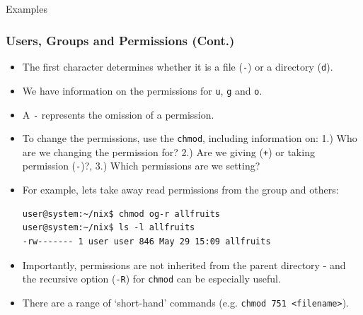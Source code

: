 \documentclass[10pt]{beamer}
\begin{document}
\subsection{}
\begin{frame}[fragile]{Examples}
\frametitle{Users, Groups and Permissions (Cont.)}
\begin{itemize}
\item The first character determines whether it is a file (\texttt{-}) or a directory (\texttt{d}).\vspace{0.05in}
\item We have information on the permissions for \texttt{u}, \texttt{g} and \texttt{o}.\vspace{0.05in}
\item A \texttt{-} represents the omission of a permission.\vspace{0.05in}
\item To change the permissions, use the \texttt{chmod}, including information on: 1.) Who are we changing the permission for? 2.) Are we giving (\texttt{+}) or taking permission (\texttt{-})?, 3.) Which permissions are we setting? \vspace{0.05in}
\item For example, lets take away read permissions from the group and others:
\begin{lstlisting}[style=BashInputStyle]
user@system:~/nix$ chmod og-r allfruits
user@system:~/nix$ ls -l allfruits
-rw------- 1 user user 846 May 29 15:09 allfruits
\end{lstlisting}\vspace{0.05in}
\item Importantly,  permissions are not inherited from the parent directory - and the recursive option (\texttt{-R}) for \texttt{chmod} can be especially useful.\vspace{0.05in}
\item There are a range of `short-hand' commands (e.g. \texttt{chmod 751 <filename>}).
\end{itemize}
\end{frame}
\end{document}
